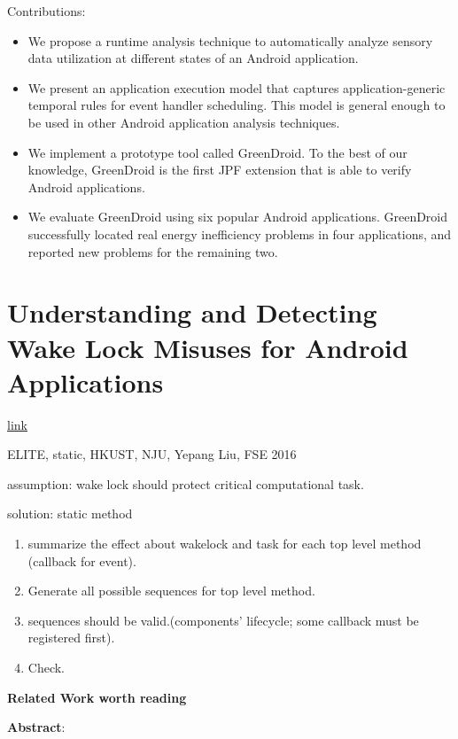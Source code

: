 \documentclass{article}
\begin{document}
Contributions:
\begin{itemize}
\item We propose a runtime analysis technique to automatically analyze sensory
  data utilization at different states of an Android application.
\item We present an application execution model that captures
  application-generic temporal rules for event handler scheduling. This model is
  general enough to be used in other Android application analysis techniques.
\item We implement a prototype tool called GreenDroid. To the best of our
  knowledge, GreenDroid is the first JPF extension that is able to verify
  Android applications.
\item We evaluate GreenDroid using six popular Android applications. GreenDroid
  successfully located real energy inefficiency problems in four applications,
  and reported new problems for the remaining two.
\end{itemize}


\section{Understanding and Detecting Wake Lock Misuses for Android Applications}

\href{http://dl.acm.org/citation.cfm?id=2950297}{link}

ELITE, static, HKUST, NJU, Yepang Liu, FSE 2016

assumption: wake lock should protect critical computational task.

solution: static method
\begin{enumerate}
\item summarize the effect about wakelock and task for each top level method
  (callback for event).
\item Generate all possible sequences for top level method.
\item sequences should be valid.(components' lifecycle; some callback must be
  registered first).
\item Check.
\end{enumerate}


\textbf{Related Work worth reading}


\textbf{Abstract}:
\end{document}
